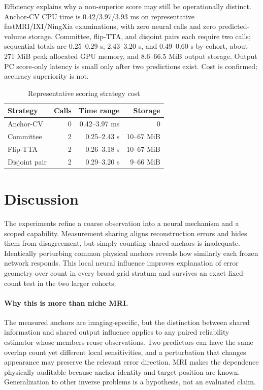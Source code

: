 \documentclass[10pt,twocolumn,letterpaper]{article}
\begin{document}
Efficiency explains why a non-superior score may still be operationally distinct. Anchor-CV CPU time is 0.42/3.97/3.93 ms on representative fastMRI/IXI/NingXia examinations, with zero neural calls and zero predicted-volume storage. Committee, flip-TTA, and disjoint pairs each require two calls; sequential totals are 0.25--0.29 s, 2.43--3.20 s, and 0.49--0.60 s by cohort, about 271 MiB peak allocated GPU memory, and 8.6--66.5 MiB output storage. Output PC score-only latency is small only after two predictions exist. Cost is confirmed; accuracy superiority is not.

\begin{table}[t]
\centering
\caption{Representative scoring strategy cost}
\label{tab:cost}
\setlength{\tabcolsep}{3.2pt}
\begin{tabular}{lrrr}
\toprule
Strategy&Calls&Time range&Storage\\
\midrule
Anchor-CV&0&0.42--3.97 ms&0\\
Committee&2&0.25--2.43 s&10--67 MiB\\
Flip-TTA&2&0.26--3.18 s&10--67 MiB\\
Disjoint pair&2&0.29--3.20 s&9--66 MiB\\
\bottomrule
\end{tabular}
\end{table}

\section{Discussion}
The experiments refine a coarse observation into a neural mechanism and a scoped capability. Measurement sharing aligns reconstruction errors and hides them from disagreement, but simply counting shared anchors is inadequate. Identically perturbing common physical anchors reveals how similarly each frozen network responds. This local neural influence improves explanation of error geometry over count in every broad-grid stratum and survives an exact fixed-count test in the two larger cohorts.

\paragraph{Why this is more than niche MRI.} The measured anchors are imaging-specific, but the distinction between shared information and shared output influence applies to any paired reliability estimator whose members reuse observations. Two predictors can have the same overlap count yet different local sensitivities, and a perturbation that changes appearance may preserve the relevant error direction. MRI makes the dependence physically auditable because anchor identity and target position are known. Generalization to other inverse problems is a hypothesis, not an evaluated claim.
\end{document}

